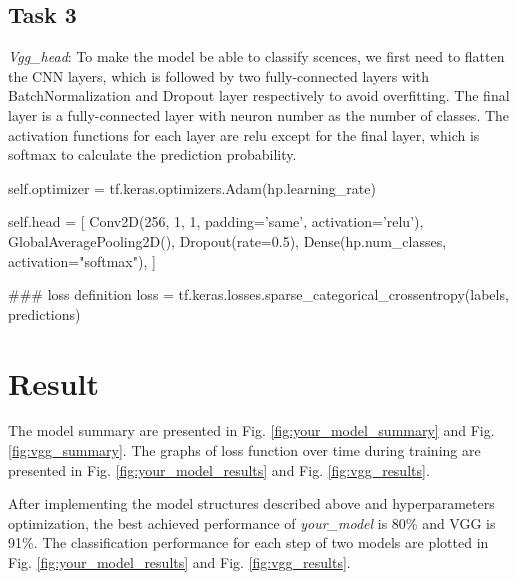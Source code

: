 \subsection*{Task 3}

\emph{Vgg\_head}: To make the model be able to classify scences, we first need to flatten the CNN layers, which is followed by two fully-connected layers with BatchNormalization and Dropout layer respectively to avoid overfitting. The final layer is a fully-connected layer with neuron number as the number of classes. The activation functions for each layer are relu except for the final layer, which is softmax to calculate the prediction probability.
    \begin{python}
self.optimizer = tf.keras.optimizers.Adam(hp.learning_rate)

self.head = [
    Conv2D(256, 1, 1, padding='same', activation='relu'),
    GlobalAveragePooling2D(),
    Dropout(rate=0.5),
    Dense(hp.num_classes, activation="softmax"),
  ]
  
### loss definition
loss = tf.keras.losses.sparse_categorical_crossentropy(labels, predictions)
    \end{python}

\section*{Result}

The model summary are presented in Fig. \ref{fig:your_model_summary} and Fig. \ref{fig:vgg_summary}. The graphs of loss function over time during training are presented in Fig. \ref{fig:your_model_results} and Fig. \ref{fig:vgg_results}.

After implementing the model structures described above and hyperparameters optimization, the best achieved performance of \emph{your\_model} is 80\% and VGG is 91\%. The classification performance for each step of two models are plotted in Fig. \ref{fig:your_model_results} and Fig. \ref{fig:vgg_results}.

